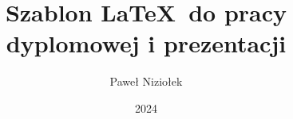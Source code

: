 \documentclass[thesis=inz]{TemplateCore/Dyplom}
\title{Szablon \LaTeX\ do pracy dyplomowej i prezentacji
}
\author{Paweł Niziołek}
\date{2024}
\begin{document}
    \frontpages
    

    \bibliografia

    
   \clearpage
     \clearpage
    \listoffigures
     \clearpage
    \listoftables
    
     \clearpage
    \lstlistoflistings
    
\end{document}

